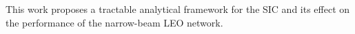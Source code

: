 \documentclass[lettersize,journal]{IEEEtran}
\begin{document}
This work proposes a tractable analytical framework for the SIC and its effect on the performance of the narrow-beam LEO network.




















%

\end{document}
